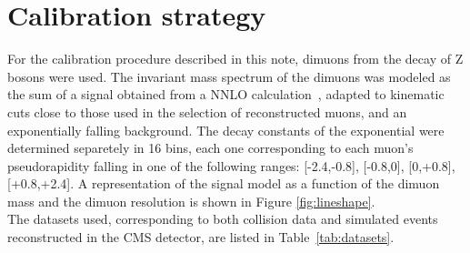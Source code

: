 \section{Calibration strategy}
\label{sec:calibration}
For the calibration procedure described in this note, dimuons from the decay of
Z bosons were used. 
The invariant mass spectrum of the dimuons 
was modeled as the sum of a signal obtained from a NNLO
calculation~\cite{Dittmaier:2009cr}, adapted to kinematic cuts close to
those used in the selection of reconstructed muons, and an
exponentially falling background. The decay constants of the
exponential were determined separetely in 16 bins, each one corresponding to each 
muon's pseudorapidity falling in one of the following ranges: [-2.4,-0.8], [-0.8,0], 
[0,+0.8], [+0.8,+2.4]. A representation of the signal model as a function of the dimuon mass 
and the dimuon resolution is shown in Figure \ref{fig:lineshape}.\\
The datasets used, corresponding to both collision data and simulated events reconstructed in the CMS 
detector, are listed in Table~\ref{tab:datasets}.
